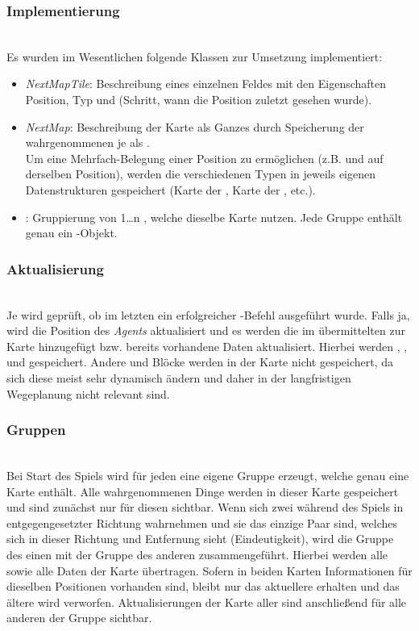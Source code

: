 \subsubsection{Implementierung} ~\\
Es wurden im Wesentlichen folgende Klassen zur Umsetzung implementiert:
\begin{itemize}
	\item \textit{NextMapTile}: Beschreibung eines einzelnen Feldes mit den Eigenschaften Position, Typ und \Step (Schritt, wann die Position zuletzt gesehen wurde).   
	\item \textit{NextMap}: Beschreibung der Karte als Ganzes durch Speicherung der wahrgenommenen \Things je \Step als \NextMapTiles. \\ Um eine Mehrfach-Belegung einer Position zu ermöglichen (z.B. \GoalZone und \Obstacle auf derselben Position), werden die verschiedenen Typen in jeweils eigenen Datenstrukturen gespeichert (Karte der \Obstacles, Karte der \GoalZones, etc.).
	\item \textit{\NextGroup}: Gruppierung von 1…n \Agents, welche dieselbe Karte nutzen. Jede Gruppe enthält genau ein \NextMap-Objekt. 
\end{itemize}

\subsubsection{Aktualisierung} ~\\
Je \Agent wird geprüft, ob im letzten \Step ein erfolgreicher \move-Befehl ausgeführt wurde. Falls ja, wird die Position des \textit{Agents} aktualisiert und es werden die im \Percept übermittelten \Things zur Karte hinzugefügt bzw. bereits vorhandene Daten aktualisiert. Hierbei werden \Dispenser, \GoalZones, \RoleZones und \Obstacles gespeichert. Andere \Agents und Blöcke werden in der Karte nicht gespeichert, da sich diese meist sehr dynamisch ändern und daher in der langfristigen Wegeplanung nicht relevant sind.

\subsubsection{Gruppen} ~\\
Bei Start des Spiels wird für jeden \Agent eine eigene Gruppe erzeugt, welche genau eine Karte enthält. Alle wahrgenommenen Dinge werden in dieser Karte gespeichert und sind zunächst nur für diesen \Agent sichtbar. 
Wenn sich zwei \Agents während des Spiels in entgegengesetzter Richtung wahrnehmen und sie das einzige Paar sind, welches sich in dieser Richtung und Entfernung sieht (Eindeutigkeit), wird die Gruppe des einen \Agent mit der Gruppe des anderen \Agent zusammengeführt. Hierbei werden alle \Agents sowie alle Daten der Karte übertragen. Sofern in beiden Karten Informationen für dieselben Positionen vorhanden sind, bleibt nur das aktuellere \NextMapTile erhalten und das ältere wird verworfen. Aktualisierungen der Karte aller \Agents sind anschließend für alle anderen \Agents der Gruppe sichtbar.

